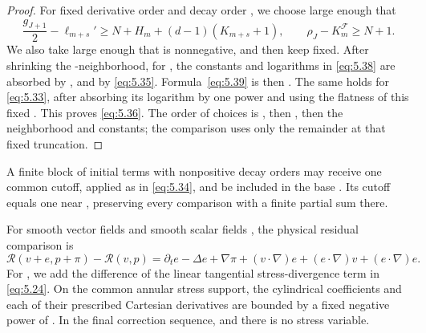 \begin{proof}
For fixed derivative order  and decay order , we
choose  large enough that
\[
 \frac{g_{J+1}}2-\ell_{m+s}'
 \geq N+H_m+(d-1)(K_{m+s}+1),
 \qquad
 \rho_J-K_m^{\mathcal F}\geq N+1.
\]
We also take  large enough that
 is nonnegative, and then keep
 fixed. After shrinking the -neighborhood,
 for , the constants and logarithms
in \eqref{eq:5.38} are absorbed by , and
 by \eqref{eq:5.35}. Formula~\eqref{eq:5.39} is then
. The same holds for \eqref{eq:5.33}, after absorbing its logarithm by
one power and using the flatness of this fixed . This proves
\eqref{eq:5.36}. The order of choices is , then
, then the neighborhood and constants; the comparison uses only the
remainder  at that fixed truncation.
\end{proof}

A finite block of initial terms with nonpositive decay orders may receive one common cutoff,
applied as in \eqref{eq:5.34}, and be included in the base . Its cutoff
equals one near , preserving every comparison with a finite partial sum
there.

For smooth vector fields  and smooth scalar fields
, the physical residual comparison is
\[
 \mathscr R(v+e,p+\pi)-\mathscr R(v,p)
 =\partial_te-\Delta e+\nabla\pi+(v\mathbin\cdot\nabla)e+(e\mathbin\cdot\nabla)v
 +(e\mathbin\cdot\nabla)e.
\]
For , we add the difference of the linear tangential
stress-divergence term in \eqref{eq:5.24}. On the common annular stress support, the cylindrical
coefficients and each of their prescribed Cartesian derivatives are bounded by a fixed negative power
of . In the final correction sequence,
 and there is no stress variable.

